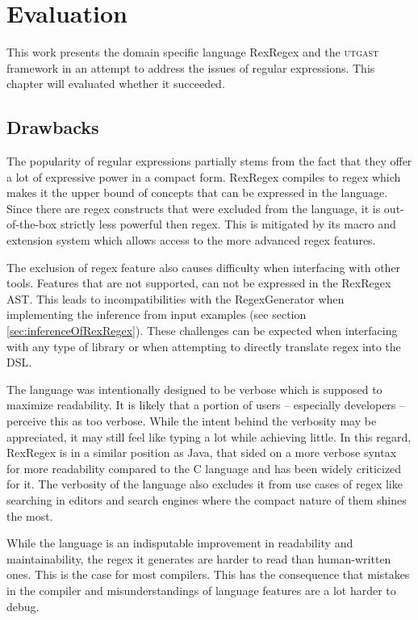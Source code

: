 \chapter{Evaluation}

This work presents the domain specific language RexRegex and the \textsc{utgast} framework in an attempt to address the issues of regular expressions. This chapter will evaluated whether it succeeded.


\section{Drawbacks}

The popularity of regular expressions partially stems from the fact that they offer a lot of expressive power in a compact form. RexRegex compiles to regex which makes it the upper bound of concepts that can be expressed in the language. Since there are regex constructs that were excluded from the language, it is out-of-the-box strictly less powerful then regex. This is mitigated by its macro and extension system which allows access to the more advanced regex features.

The exclusion of regex feature also causes difficulty when interfacing with other tools. Features that are not supported, can not be expressed in the RexRegex AST. This leads to incompatibilities with the RegexGenerator \cite{bartoli2016inference} when implementing the inference from input examples (see section \ref{sec:inferenceOfRexRegex}). These challenges can be expected when interfacing with any type of library or when attempting to directly translate regex into the DSL.

The language was intentionally designed to be verbose which is supposed to maximize readability. It is likely that a portion of users -- especially developers -- perceive this as too verbose. While the intent behind the verbosity may be appreciated, it may still feel like typing a lot while achieving little. In this regard, RexRegex is in a similar position as Java, that sided on a more verbose syntax for more readability compared to the C language and has been widely criticized for it. The verbosity of the language also excludes it from use cases of regex like searching in editors and search engines where the compact nature of them shines the most.

While the language is an indisputable improvement in readability and maintainability, the regex it generates are harder to read than human-written ones. This is the case for most compilers. This has the consequence that mistakes in the compiler and misunderstandings of language features are a lot harder to debug.

